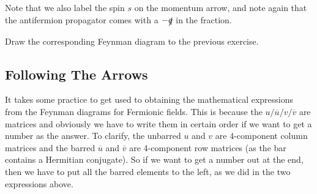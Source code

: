 \noindent Note that we also label the spin $s$ on the momentum arrow, and note again that the antifermion propagator comes with a $-\slashed{q}$ in the fraction. 

\bbox 
    Draw the corresponding Feynman diagram to the previous exercise. 
\ebox 

\subsection{Following The Arrows}

It takes some practice to get used to obtaining the mathematical expressions from the Feynman diagrams for Fermionic fields. This is because the $u/\overline{u}/v/\overline{v}$ are matrices and obviously we have to write them in certain order if we want to get a number as the answer. To clarify, the unbarred $u$ and $v$ are 4-component column matrices and the barred $\overline{u}$ and $\overline{v}$ are 4-component row matrices (as the bar contains a Hermitian conjugate). So if we want to get a number out at the end, then we have to put all the barred elements to the left, as we did in the two expressions above. 

